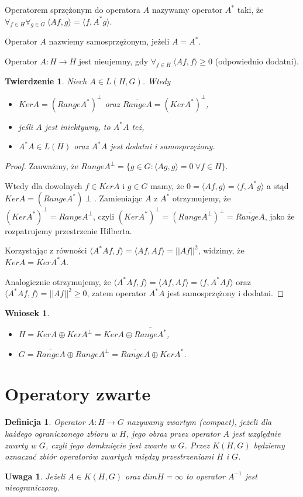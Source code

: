 \documentclass[12pt]{article}
\newtheorem{tw}{Twierdzenie}
\newtheorem{df}{Definicja}
\newtheorem{wn}{Wniosek}
\newtheorem{uw}{Uwaga}
\begin{document}
Operatorem sprzężonym do operatora $A$ nazywamy operator $A^*$ taki, że $\forall_{f\in H}\forall_{g\in G}\ \langle Af,g\rangle=\langle f,A^*g\rangle$.

Operator $A$ nazwiemy samosprzężonym, jeżeli $A=A^*$.

Operator $A\colon H\to H$ jest nieujemny, gdy $\forall_{f\in H}\ \langle Af,f\rangle\geq 0$ (odpowiednio dodatni).

\begin{tw}
Niech $A\in L(H,G)$. Wtedy
\begin{itemize}
\item $KerA=(RangeA^*)^{\perp}$ oraz $\overline{RangeA}=(KerA^*)^{\perp}$,
\item jeśli $A$ jest iniektywny, to $A^*A$ też,
\item $A^*A\in L(H)$ oraz $A^*A$ jest dodatni i samosprzężony.
\end{itemize}
\end{tw}
\begin{proof}
Zauważmy, że $RangeA^{\perp}=\{g\in G\colon \langle Ag,g\rangle =0\ \forall f\in H\}$.

Wtedy dla dowolnych $f\in KerA$ i $g\in G$ mamy, że $0=\langle Af,g\rangle=\langle f,A^*g\rangle$ a stąd $KerA=(RangeA^*){\perp}$. Zamieniając $A$ z $A^*$ otrzymujemy, że $(KerA^*)^{\perp}=RangeA^{\perp}$, czyli $(KerA^*)^{\perp}=(RangeA^{\perp})^{\perp}=\overline{RangeA}$, jako że rozpatrujemy przestrzenie Hilberta.

Korzystając z równości $\langle A^*Af,f\rangle=\langle Af,Af\rangle=||Af||^2$, widzimy, że $KerA=KerA^*A$.

Analogicznie otrzymujemy, że $\langle A^*Af,f\rangle=\langle Af,Af\rangle=\langle f, A^*Af\rangle$ oraz $\langle A^*Af, f\rangle=||Af||^2\geq 0$, zatem operator $A^*A$ jest samosprzężony i dodatni.
\end{proof}
\begin{wn}
\begin{itemize}
\item $H=KerA \oplus KerA^{\perp}=KerA\oplus \overline{RangeA^*}$,
\item $G=\overline{RangeA}\oplus RangeA^{\perp}=\overline{RangeA}\oplus KerA^*$.
\end{itemize}
\end{wn}

\section{Operatory zwarte}
\begin{df}
Operator $A\colon H \to G$ nazywamy zwartym (compact), jeżeli dla każdego ograniczonego zbioru w $H$, jego obraz przez operator $A$ jest względnie zwarty w $G$, czyli jego domknięcie jest zwarte w $G$. Przez $K(H,G)$ będziemy oznaczać zbiór operatorów zwartych między przestrzeniami $H$ i $G$.
\end{df}
\begin{uw}
Jeżeli $A\in K(H,G)$ oraz $dimH=\infty$ to operator $A^{-1}$ jest nieograniczony.
\end{uw}
\end{document}
